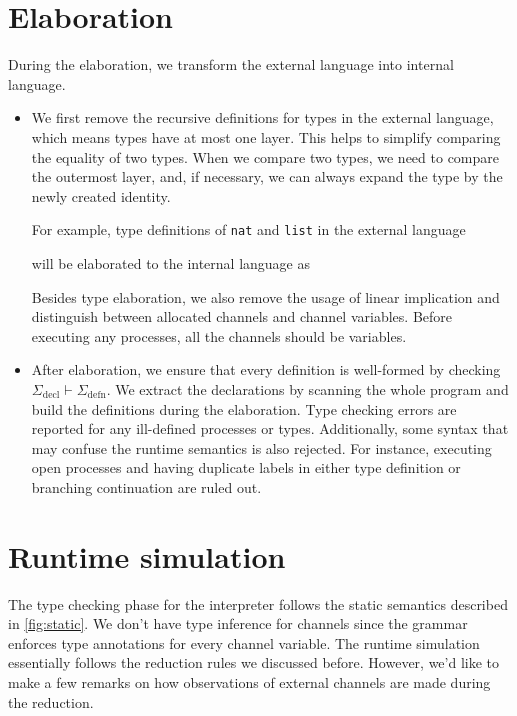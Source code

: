 \documentclass[12pt, openany]{memoir}
\begin{document}
\section{Elaboration}
During the elaboration, we transform the external language into internal language.
\begin{itemize}
  \item We first remove the recursive definitions for types in the external language, which means types have at most one layer.
  This helps to simplify comparing the equality of two types. When we compare two types, we need to compare the outermost layer,
  and, if necessary, we can always expand the type by the newly created identity.

  For example, type definitions of \texttt{nat} and \texttt{list} in the external language 
  
  will be elaborated to the internal language as
  
  Besides type elaboration, we also remove the usage of linear implication and distinguish between allocated channels and channel variables.
  Before executing any processes, all the channels should be variables.
  \item After elaboration, we ensure that every definition is well-formed by checking $\Sigma_\text{decl} \vdash \Sigma_\text{defn}$. 
  We extract the declarations by scanning the whole program and build the definitions during the elaboration. 
  Type checking errors are reported for any ill-defined processes or types. 
  Additionally, some syntax that may confuse the runtime semantics is also rejected. 
  For instance, executing open processes and having duplicate labels in either type definition or branching continuation are ruled out.
\end{itemize}
\section{Runtime simulation}
The type checking phase for the interpreter follows the static semantics described in \cref{fig:static}. 
We don't have type inference for channels since the grammar enforces type annotations for every channel variable. 
The runtime simulation essentially follows the reduction rules we discussed before. 
However, we'd like to make a few remarks on how observations of external channels are made during the reduction.
\end{document}
